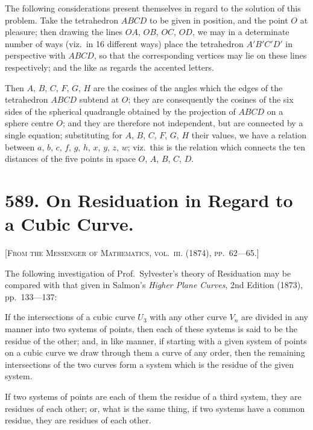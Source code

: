 \documentclass[11pt,a4paper]{article}
\theoremstyle{plain}
\theoremstyle{definition}
\theoremstyle{remark}
\begin{document}
The following considerations present themselves in regard to the solution of this problem. Take the tetrahedron $ABCD$ to be given in position, and the point $O$ at pleasure; then drawing the lines $OA$, $OB$, $OC$, $OD$, we may in a determinate number of ways (viz.\ in 16 different ways) place the tetrahedron $A'B'C'D'$ in perspective with $ABCD$, so that the corresponding vertices may lie on these lines respectively; and the like as regards the accented letters.

Then $A$, $B$, $C$, $F$, $G$, $H$ are the cosines of the angles which the edges of the tetrahedron $ABCD$ subtend at $O$; they are consequently the cosines of the six sides of the spherical quadrangle obtained by the projection of $ABCD$ on a sphere centre $O$; and they are therefore not independent, but are connected by a single equation; substituting for $A$, $B$, $C$, $F$, $G$, $H$ their values, we have a relation between $a$, $b$, $c$, $f$, $g$, $h$, $x$, $y$, $z$, $w$; viz.\ this is the relation which connects the ten distances of the five points in space $O$, $A$, $B$, $C$, $D$.

\newpage

\section*{589. On Residuation in Regard to a Cubic Curve.}

\noindent\textsc{[From the Messenger of Mathematics, vol.~\textsc{iii}. (1874), pp.~62---65.]}

\medskip

\noindent The following investigation of Prof.\ Sylvester's theory of Residuation may be compared with that given in Salmon's \textit{Higher Plane Curves}, 2nd Edition (1873), pp.~133---137:

If the intersections of a cubic curve $U_3$ with any other curve $V_n$ are divided in any manner into two systems of points, then each of these systems is said to be the residue of the other; and, in like manner, if starting with a given system of points on a cubic curve we draw through them a curve of any order, then the remaining intersections of the two curves form a system which is the residue of the given system.

If two systems of points are each of them the residue of a third system, they are residues of each other; or, what is the same thing, if two systems have a common residue, they are residues of each other.
\end{document}
